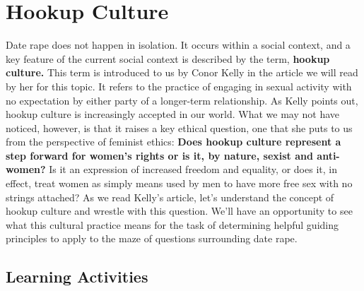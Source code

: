 \documentclass[
]{book}
\begin{document}
\hypertarget{hookup-culture}{%
\section*{Hookup Culture}\label{hookup-culture}}

Date rape does not happen in isolation. It occurs within a social context, and a key feature of the current social context is described by the term, \textbf{hookup culture.} This term is introduced to us by Conor Kelly in the article we will read by her for this topic. It refers to the practice of engaging in sexual activity with no expectation by either party of a longer-term relationship.
As Kelly points out, hookup culture is increasingly accepted in our world. What we may not have noticed, however, is that it raises a key ethical question, one that she puts to us from the perspective of feminist ethics: \textbf{Does hookup culture represent a step forward for women's rights or is it, by nature, sexist and anti-women?} Is it an expression of increased freedom and equality, or does it, in effect, treat women as simply means used by men to have more free sex with no strings attached?
As we read Kelly's article, let's understand the concept of hookup culture and wrestle with this question. We'll have an opportunity to see what this cultural practice means for the task of determining helpful guiding principles to apply to the maze of questions surrounding date rape.

\hypertarget{learning-activities-15}{%
\subsection*{Learning Activities}\label{learning-activities-15}}
\end{document}
